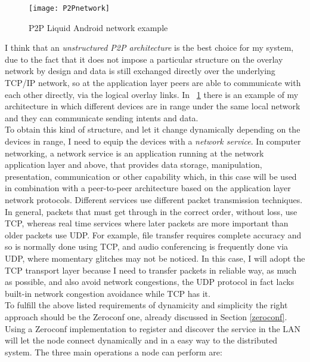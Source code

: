 \begin{figure}[h]
\centering
\texttt{[image: P2Pnetwork]}
\caption{P2P Liquid Android network example}
\label{fig:4.3}
\end{figure}
I think that an \textit{unstructured P2P architecture} is the best choice for my system, due to the fact that it does not impose a particular structure on the overlay network by design and data is still exchanged directly over the underlying TCP/IP network, so at the application layer peers are able to communicate with each other directly, via the logical overlay links. In \figurename~\ref{fig:4.3} there is an example of my architecture in which different devices are in range under the same local network and they can communicate sending intents and data.\\
To obtain this kind of structure, and let it change dynamically depending on the devices in range, I need to equip the devices with a \textit{network service}. In computer networking, a network service is an application running at the network application layer and above, that provides data storage, manipulation, presentation, communication or other capability which, in this case will be used in combination with a peer-to-peer architecture based on the application layer network protocols. Different services use different packet transmission techniques. In general, packets that must get through in the correct order, without loss, use TCP, whereas real time services where later packets are more important than older packets use UDP. For example, file transfer requires complete accuracy and so is normally done using TCP, and audio conferencing is frequently done via UDP, where momentary glitches may not be noticed. In this case, I will adopt the TCP transport layer because I need to transfer packets in reliable way, as much as possible, and also avoid network congestions, the UDP protocol in fact lacks built-in network congestion avoidance while TCP has it.\\
To fulfill the above listed requirements of dynamicity and simplicity the right approach should be the Zeroconf one, already discussed in Section \ref{zeroconf}. Using a Zeroconf implementation to register and discover the service in the LAN will let the node connect dynamically and in a easy way to the distributed system. The three main operations a node can perform are:
